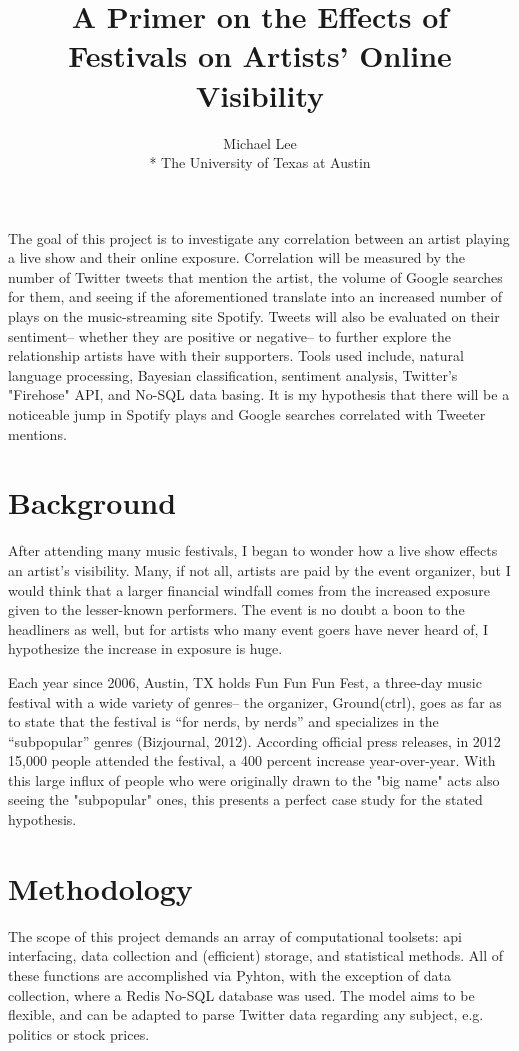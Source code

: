 \documentclass{article}
\title{A Primer on the Effects of Festivals on Artists' Online Visibility}
\author{Michael Lee \\*
The University of Texas at Austin}
\begin{document}
\maketitle{}



The goal of this project is to investigate any correlation between an artist playing a live show and their online exposure. Correlation will be measured by the number of Twitter tweets that mention the artist, the volume of Google searches for them, and seeing if the aforementioned translate into an increased number of plays on the music-streaming site Spotify. Tweets will also be evaluated on their sentiment-- whether they are positive or negative-- to further explore the relationship artists have with their supporters. Tools used include, natural language processing, Bayesian classification, sentiment analysis, Twitter's "Firehose" API, and No-SQL data basing. It is my hypothesis that there will be a noticeable jump in Spotify plays and Google searches correlated with Tweeter mentions. 


\newpage
\section{Background}  
After attending many music festivals, I began to wonder how a live show effects an artist's visibility. Many, if not all, artists are paid by the event organizer, but I would think that a larger financial windfall comes from the increased exposure given to the lesser-known performers. The event is no doubt a boon to the headliners as well, but for artists who many event goers have never heard of, I hypothesize the increase in exposure is huge. \* 

Each year since 2006, Austin, TX holds Fun Fun Fun Fest, a three-day music festival with a wide variety of genres-- the organizer, Ground(ctrl), goes as far as to state that the festival is “for nerds, by nerds” and specializes in the “subpopular” genres (Bizjournal, 2012). According official press releases, in 2012 15,000 people attended the festival, a 400 percent increase year-over-year. With this large influx of people who were originally drawn to the "big name" acts also seeing the "subpopular" ones, this presents a perfect case study for the stated hypothesis. 

\section{Methodology}
The scope of this project demands an array of computational toolsets: api interfacing, data collection and (efficient) storage, and statistical methods. All of these functions are accomplished via Pyhton, with the exception of data collection, where a Redis No-SQL database was used. The model aims to be flexible, and can be adapted to parse Twitter data regarding any subject, e.g. politics or stock prices. 
\end{document}

